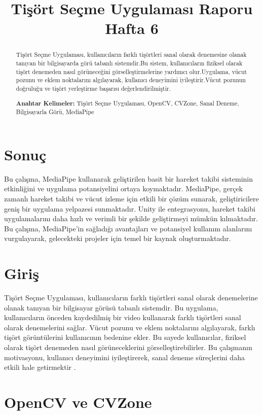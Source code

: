 \documentclass[12pt, a4paper]{article}
\begin{document}
\section{Sonuç}
Bu çalışma, MediaPipe kullanarak geliştirilen basit bir hareket takibi sisteminin etkinliğini ve uygulama potansiyelini ortaya koymaktadır. MediaPipe, gerçek zamanlı hareket takibi ve vücut izleme için etkili bir çözüm sunarak, geliştiricilere geniş bir uygulama yelpazesi sunmaktadır. Unity ile entegrasyonu, hareket takibi uygulamalarını daha hızlı ve verimli bir şekilde geliştirmeyi mümkün kılmaktadır. Bu çalışma, MediaPipe'in sağladığı avantajları ve potansiyel kullanım alanlarını vurgulayarak, gelecekteki projeler için temel bir kaynak oluşturmaktadır.
\newpage
\title{Tişört Seçme Uygulaması Raporu
	Hafta 6}
\author{}
\date{}
\maketitle
\setcounter{section}{0}
\begin{abstract}
	\begin{justify}
		Tişört Seçme Uygulaması, kullanıcıların farklı tişörtleri sanal olarak denemesine olanak tanıyan bir bilgisayarda görü tabanlı sistemdir.Bu sistem, kullanıcıların fiziksel olarak tişört denemeden nasıl görüneceğini görselleştirmelerine yardımcı olur.Uygulama, vücut pozunu ve eklem noktalarını algılayarak, kullanıcı deneyimini iyileştirir.Vücut pozunun doğruluğu ve tişört yerleştirme başarısı değerlendirilmiştir.   
		
	\end{justify}
	\textbf{Anahtar Kelimeler:}  Tişört Seçme Uygulaması, OpenCV, CVZone, Sanal Deneme, Bilgisayarla Görü, MediaPipe
\end{abstract}
\section{Giriş}
Tişört Seçme Uygulaması, kullanıcıların farklı tişörtleri sanal olarak denemelerine olanak tanıyan bir bilgisayar görüsü tabanlı sistemdir. Bu uygulama, kullanıcıların önceden kaydedilmiş bir video kullanarak farklı tişörtleri sanal olarak denemelerini sağlar. Vücut pozunu ve eklem noktalarını algılayarak, farklı tişört görüntülerini kullanıcının bedenine ekler. Bu sayede kullanıcılar, fiziksel olarak tişört denemeden nasıl görüneceklerini görselleştirebilirler. Bu çalışmanın motivasyonu, kullanıcı deneyimini iyileştirerek, sanal deneme süreçlerini daha etkili hale getirmektir \cite{Tisort}.
\section{OpenCV ve CVZone}
\end{document}
